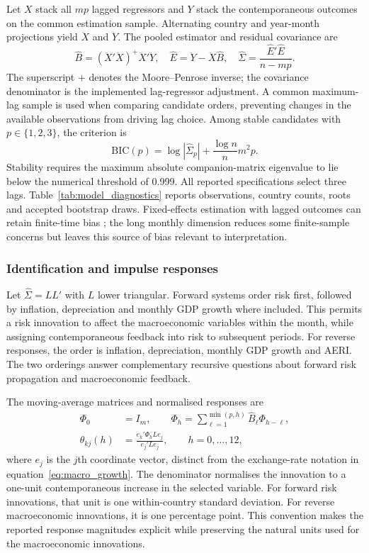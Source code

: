 Let $X$ stack all $mp$ lagged regressors and $Y$ stack the contemporaneous outcomes on the common estimation sample. Alternating country and year-month projections yield $\ddot X$ and $\ddot Y$. The pooled estimator and residual covariance are
\begin{equation}
 \widehat B=(\ddot X'\ddot X)^+\ddot X'\ddot Y,\quad
 \widehat E=\ddot Y-\ddot X\widehat B,\quad
 \widehat\Sigma=\frac{\widehat E'\widehat E}{n-mp}.\label{eq:pooled_ols}
\end{equation}
The superscript $+$ denotes the Moore--Penrose inverse; the covariance denominator is the implemented lag-regressor adjustment. A common maximum-lag sample is used when comparing candidate orders, preventing changes in the available observations from driving lag choice. Among stable candidates with $p\in\{1,2,3\}$, the criterion is
\begin{equation}
 \mathrm{BIC}(p)=\log|\widehat\Sigma_p|+\frac{\log n}{n}m^2p.\label{eq:bic}
\end{equation}
Stability requires the maximum absolute companion-matrix eigenvalue to lie below the numerical threshold of 0.999. All reported specifications select three lags. Table~\ref{tab:model_diagnostics} reports observations, country counts, roots and accepted bootstrap draws. Fixed-effects estimation with lagged outcomes can retain finite-time bias \citep{nickell1981}; the long monthly dimension reduces some finite-sample concerns but leaves this source of bias relevant to interpretation.

\subsubsection{Identification and impulse responses}
Let $\widehat\Sigma=LL'$ with $L$ lower triangular. Forward systems order risk first, followed by inflation, depreciation and monthly GDP growth where included. This permits a risk innovation to affect the macroeconomic variables within the month, while assigning contemporaneous feedback into risk to subsequent periods. For reverse responses, the order is inflation, depreciation, monthly GDP growth and AERI. The two orderings answer complementary recursive questions about forward risk propagation and macroeconomic feedback.

The moving-average matrices and normalised responses are
\begin{align}
 \Phi_0&=I_m,\qquad
 \Phi_h=\sum_{\ell=1}^{\min(p,h)}\widehat B_\ell\Phi_{h-\ell},\label{eq:ma}\\
 \theta_{kj}(h)&=\frac{e_k'\Phi_hLe_j}{e_j'Le_j},\qquad h=0,\ldots,12,\label{eq:irf}
\end{align}
where $e_j$ is the $j$th coordinate vector, distinct from the exchange-rate notation in equation~\eqref{eq:macro_growth}. The denominator normalises the innovation to a one-unit contemporaneous increase in the selected variable. For forward risk innovations, that unit is one within-country standard deviation. For reverse macroeconomic innovations, it is one percentage point. This convention makes the reported response magnitudes explicit while preserving the natural units used for the macroeconomic innovations.

